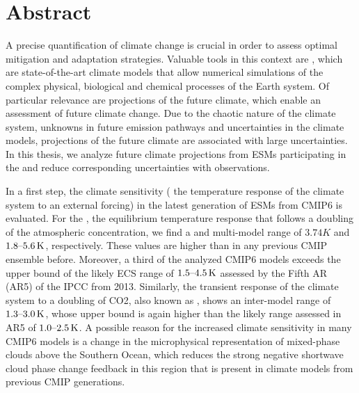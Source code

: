 


\chapter*{Abstract}

A precise quantification of climate change is crucial in order to assess
optimal mitigation and adaptation strategies. Valuable tools in this context
are , which are state-of-the-art climate models that allow
numerical simulations of the complex physical, biological and chemical
processes of the Earth system. Of particular relevance are projections of the
future climate, which enable an assessment of future climate change. Due to the
chaotic nature of the climate system, unknowns in future emission pathways and
uncertainties in the climate models, projections of the future climate are
associated with large uncertainties. In this thesis, we analyze future climate
projections from \acsp{ESM} participating in the  and reduce
corresponding uncertainties with observations.

In a first step, the climate sensitivity (\ie{} the temperature response of the
climate system to an external forcing) in the latest generation of \acsp{ESM}
from \acs{CMIP}6 is evaluated. For the , the equilibrium
temperature response that follows a doubling of the atmospheric
 concentration, we find a  and multi-model
range of $3.74 \unit{K}$ and $\rangeunit{1.8}{5.6}{K}$, respectively. These
values are higher than in any previous \acs{CMIP} ensemble before. Moreover, a
third of the analyzed \acs{CMIP}6 models exceeds the upper bound of the likely
\acs{ECS} range of $\rangeunit{1.5}{4.5}{K}$ assessed by the Fifth \acl{AR}
(\acs{AR}5) of the \acl{IPCC} from 2013. Similarly, the transient response of
the climate system to a doubling of \acs{CO2}, also known as ,
shows an inter-model range of $\rangeunit{1.3}{3.0}{K}$, whose upper bound is
again higher than the likely range assessed in \acs{AR}5 of
$\rangeunit{1.0}{2.5}{K}$. A possible reason for the increased climate
sensitivity in many \acs{CMIP}6 models is a change in the microphysical
representation of mixed-phase clouds above the Southern Ocean, which reduces
the strong negative shortwave cloud phase change feedback in this region that
is present in climate models from previous \acs{CMIP} generations.

